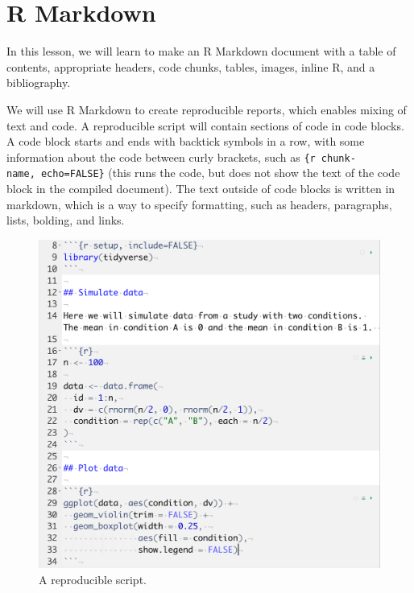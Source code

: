 \documentclass[
  oneside]{book}
\begin{document}
\hypertarget{r-markdown}{%
\section{R Markdown}\label{r-markdown}}

In this lesson, we will learn to make an R Markdown document with a table of contents, appropriate headers, code chunks, tables, images, inline R, and a bibliography.

We will use R Markdown to create reproducible reports, which enables mixing of text and code. A reproducible script will contain sections of code in code blocks. A code block starts and ends with backtick symbols in a row, with some information about the code between curly brackets, such as \texttt{\{r\ chunk-name,\ echo=FALSE\}} (this runs the code, but does not show the text of the code block in the compiled document). The text outside of code blocks is written in markdown, which is a way to specify formatting, such as headers, paragraphs, lists, bolding, and links.

\begin{figure}

{\centering \includegraphics[width=1\linewidth]{images/01/reproducibleScript} 

}

\caption{A reproducible script.}\label{fig:img-reproducibleScript}
\end{figure}
\end{document}
